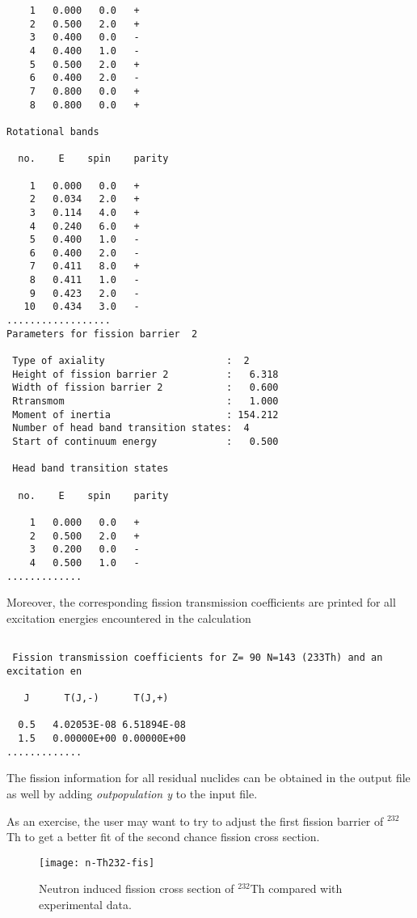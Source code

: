\begin{samplecase}
{\begin{verbatim}
    1   0.000   0.0   +
    2   0.500   2.0   +
    3   0.400   0.0   -
    4   0.400   1.0   -
    5   0.500   2.0   +
    6   0.400   2.0   -
    7   0.800   0.0   +
    8   0.800   0.0   +

Rotational bands

  no.    E    spin    parity

    1   0.000   0.0   +
    2   0.034   2.0   +
    3   0.114   4.0   +
    4   0.240   6.0   +
    5   0.400   1.0   -
    6   0.400   2.0   -
    7   0.411   8.0   +
    8   0.411   1.0   -
    9   0.423   2.0   -
   10   0.434   3.0   -
..................
Parameters for fission barrier  2

 Type of axiality                     :  2
 Height of fission barrier 2          :   6.318
 Width of fission barrier 2           :   0.600
 Rtransmom                            :   1.000
 Moment of inertia                    : 154.212
 Number of head band transition states:  4
 Start of continuum energy            :   0.500

 Head band transition states

  no.    E    spin    parity

    1   0.000   0.0   +
    2   0.500   2.0   +
    3   0.200   0.0   -
    4   0.500   1.0   -
.............
\end{verbatim} } \renewcommand{\baselinestretch}{1.07}\small\normalsize
\noindent

Moreover, the corresponding fission transmission coefficients are printed for
all excitation energies encountered in the calculation
{\small \begin{verbatim}

 Fission transmission coefficients for Z= 90 N=143 (233Th) and an excitation en

   J      T(J,-)      T(J,+)

  0.5   4.02053E-08 6.51894E-08
  1.5   0.00000E+00 0.00000E+00
.............
\end{verbatim} } \renewcommand{\baselinestretch}{1.07}\small\normalsize
The fission information for all residual nuclides can be obtained in the
output file as well by adding {\em outpopulation y} to the input file.

As an exercise, the user may want to try to adjust the first fission barrier
of $^{232}$Th to get a better fit of the second chance fission cross section.

\end{samplecase}
\begin{figure}
\centering\texttt{[image: n-Th232-fis]}
\caption{Neutron induced fission cross section of ${}^{232}$Th compared with
experimental data.}
\label{fissioneps}
\end{figure}
